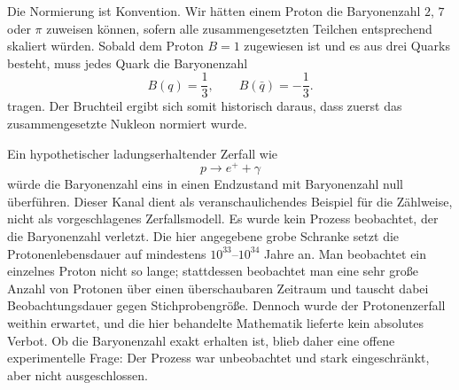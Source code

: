 Die Normierung ist Konvention. Wir hätten einem Proton die Baryonenzahl \(2\), \(7\) oder \(\pi\) zuweisen können, sofern alle zusammengesetzten Teilchen entsprechend skaliert würden. Sobald dem Proton \(B=1\) zugewiesen ist und es aus drei Quarks besteht, muss jedes Quark die Baryonenzahl
\begin{equation}
B(q)=\frac13,
\qquad
B(\bar q)=-\frac13.
\end{equation}
tragen. Der Bruchteil ergibt sich somit historisch daraus, dass zuerst das zusammengesetzte Nukleon normiert wurde.

\begin{classroomqa}
\end{classroomqa}

Ein hypothetischer ladungserhaltender Zerfall wie
\begin{equation}
p\longrightarrow e^++\gamma
\end{equation}
würde die Baryonenzahl eins in einen Endzustand mit Baryonenzahl null überführen. Dieser Kanal dient als veranschaulichendes Beispiel für die Zählweise, nicht als vorgeschlagenes Zerfallsmodell. Es wurde kein Prozess beobachtet, der die Baryonenzahl verletzt. Die hier angegebene grobe Schranke setzt die Protonenlebensdauer auf mindestens \(10^{33}\)--\(10^{34}\) Jahre an. Man beobachtet ein einzelnes Proton nicht so lange; stattdessen beobachtet man eine sehr große Anzahl von Protonen über einen überschaubaren Zeitraum und tauscht dabei Beobachtungsdauer gegen Stichprobengröße. Dennoch wurde der Protonenzerfall weithin erwartet, und die hier behandelte Mathematik lieferte kein absolutes Verbot. Ob die Baryonenzahl exakt erhalten ist, blieb daher eine offene experimentelle Frage: Der Prozess war unbeobachtet und stark eingeschränkt, aber nicht ausgeschlossen.

\begin{classroomqa}
\end{classroomqa}

